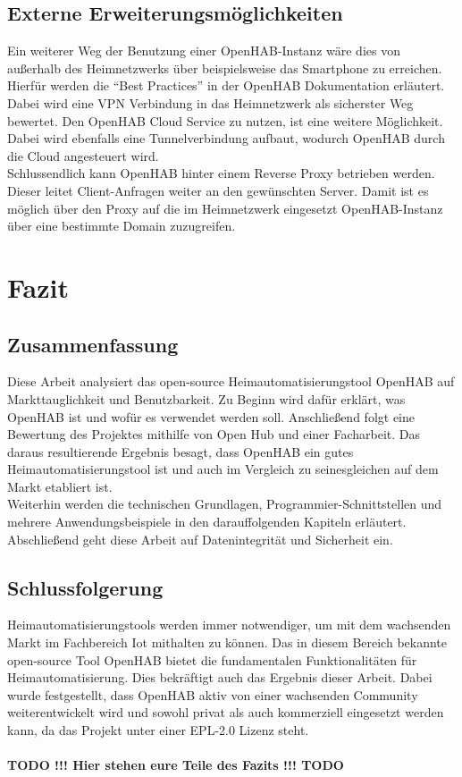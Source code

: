 \subsection{Externe Erweiterungsmöglichkeiten}
Ein weiterer Weg der Benutzung einer OpenHAB-Instanz wäre dies von außerhalb des Heimnetzwerks über beispielsweise das Smartphone zu erreichen. Hierfür werden die "`Best Practices"' in der OpenHAB Dokumentation erläutert.\\
Dabei wird eine VPN Verbindung in das Heimnetzwerk als sicherster Weg bewertet. Den OpenHAB Cloud Service zu nutzen, ist eine weitere Möglichkeit. Dabei wird ebenfalls eine Tunnelverbindung aufbaut, wodurch OpenHAB durch die Cloud angesteuert wird.\\
Schlussendlich kann OpenHAB hinter einem Reverse Proxy betrieben werden. Dieser leitet Client-Anfragen weiter an den gewünschten Server. Damit ist es möglich über den Proxy auf die im Heimnetzwerk eingesetzt OpenHAB-Instanz über eine bestimmte Domain zuzugreifen.


\section{Fazit}
\subsection{Zusammenfassung}
Diese Arbeit analysiert das open-source Heimautomatisierungstool OpenHAB auf Markttauglichkeit und Benutzbarkeit. Zu Beginn wird dafür erklärt, was OpenHAB ist und wofür es verwendet werden soll. Anschließend folgt eine Bewertung des Projektes mithilfe von Open Hub und einer Facharbeit. Das daraus resultierende Ergebnis besagt, dass OpenHAB ein gutes Heimautomatisierungstool ist und auch im Vergleich zu seinesgleichen auf dem Markt etabliert ist.\\
Weiterhin werden die technischen Grundlagen, Programmier-Schnittstellen und mehrere Anwendungsbeispiele in den darauffolgenden Kapiteln erläutert.\\
Abschließend geht diese Arbeit auf Datenintegrität und Sicherheit ein.

\subsection{Schlussfolgerung}
Heimautomatisierungstools werden immer notwendiger, um mit dem wachsenden Markt im Fachbereich Iot mithalten zu können.\cite{STATISTA01:IOT} Das in diesem Bereich bekannte open-source Tool OpenHAB bietet die fundamentalen Funktionalitäten für Heimautomatisierung. Dies bekräftigt auch das Ergebnis dieser Arbeit. Dabei wurde festgestellt, dass OpenHAB aktiv von einer wachsenden Community weiterentwickelt wird und sowohl privat als auch kommerziell eingesetzt werden kann, da das Projekt unter einer EPL-2.0 Lizenz steht.\\
\\
\textbf{TODO !!! Hier stehen eure Teile des Fazits !!! TODO}\\

